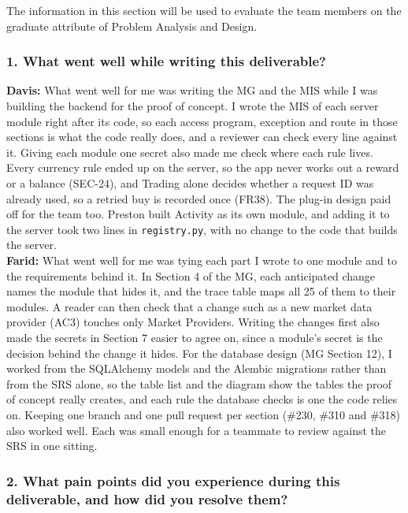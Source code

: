 \documentclass[12pt, titlepage]{article}
\begin{document}
The information in this section will be used to evaluate the team members on the
graduate attribute of Problem Analysis and Design.



\subsubsection*{1. What went well while writing this deliverable?}

\noindent\textbf{Davis:} What went well for me was writing the MG and the MIS
while I was building the backend for the proof of concept. I wrote the MIS of
each server module right after its code, so each access program, exception and
route in those sections is what the code really does, and a reviewer can check
every line against it. Giving each module one secret also made me check where
each rule lives. Every currency rule ended up on the server, so the app never
works out a reward or a balance (SEC-24), and Trading alone decides whether a
request ID was already used, so a retried buy is recorded once (FR38). The
plug-in design paid off for the team too. Preston built Activity as its own
module, and adding it to the server took two lines in \texttt{registry.py},
with no change to the code that builds the server. \\

\noindent\textbf{Farid:} What went well for me was tying each part I
wrote to one module and to the requirements behind it. In Section 4 of the MG,
each anticipated change names the module that hides it, and the trace table
maps all 25 of them to their modules. A reader can then check that a change
such as a new market data provider (AC3) touches only Market Providers.
Writing the changes first also made the secrets in Section 7 easier to agree
on, since a module's secret is the decision behind the change it hides. For the
database design (MG Section 12), I worked from the SQLAlchemy models and the
Alembic migrations rather than from the SRS alone, so the table list and the
diagram show the tables the proof of concept really creates, and each rule the
database checks is one the code relies on. Keeping one branch and one pull
request per section (\#230, \#310 and \#318) also worked well. Each was small
enough for a teammate to review against the SRS in one sitting.

\subsubsection*{2. What pain points did you experience during this deliverable,
and how did you resolve them?}
\end{document}
